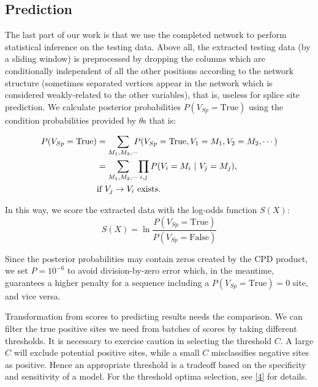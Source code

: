 \documentclass[journal,twoside]{IEEEtran}
\begin{document}
\subsection{Prediction}\label{2.5}

The last part of our work is that we use the completed network to perform statistical inference on the testing data. Above all, the extracted testing data (by a sliding window) is preprocessed by dropping the columns which are conditionally independent of all the other positions according to the network structure (sometimes separated vertices appear in the network which is considered weakly-related to the other variables), that is, useless for splice site prediction. We calculate posterior probabilities $P(V_{Sp} = \text{True})$ using the condition probabilities provided by $\theta$s that is:
\begin{small}
\begin{align}
P(V_{Sp} = \text{True}) & = \sum\limits_{M_1, M_2, \cdots}\!\!\!\!P(V_{Sp} = \text{True}, V_1 = M_1, V_2 = M_2, \cdots) \notag \\
& = \sum\limits_{M_1, M_2, \cdots}\!\prod\limits_{i, j} P(V_i = M_i \ | \ V_j = M_j), \notag \\  
& \text{if} \ V_j \rightarrow V_i \ \text{exists}.
\label{eq3}
\end{align}
\end{small}
In this way, we score the extracted data with the log-odds function $S(X)$: 
\begin{equation}
S(X) = \ln \displaystyle\frac{P(V_{Sp} = \text{True})}{P(V_{Sp} = \text{False})}
\label{eq4}
\end{equation}

Since the posterior probabilities may contain zeros created by the CPD product, we set $P = 10^{-6}$ to avoid division-by-zero error which, in the meantime, guarantees a higher penalty for a sequence including a $P(V_{Sp} = \text{True}) = 0$ site, and vice versa. 

Transformation from scores to predicting results needs the comparison. We can filter the true positive sites we need from batches of scores by taking different thresholds. It is necessary to exercise caution in selecting the threshold $C$. A large $C$ will exclude potential positive sites, while a small $C$ misclassifies negative sites as positive. Hence an appropriate threshold is a tradeoff based on the specificity and sensitivity of a model. For the threshold optima selection, see \ref{4} for details. 
\end{document}
